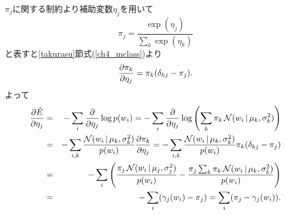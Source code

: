 $\pi_j$に関する制約より補助変数$\eta_j$を用いて
$$
\pi_j=\frac{\exp(\eta_j)}{\sum_k \exp(\eta_k)}
$$
と表すと\ref{takurasu}節式(\ref{ch4_mclass})より
$$
\diff{\eta_j}{\pi_k}=\pi_k(\delta_{kj}-\pi_j).
$$
よって
\begin{eqnarray*}
\diff{\eta_j}{\tilde{E}}
 &=& -\sum_i \dif{\eta_j} \log p(w_i)=-\sum_i\dif{\eta_j} \log \left(\sum_k \pi_k\, \calN(w_i\,|\,\mu_k,\sigma_k^2)\right)\\
 &=& -\sum_{i,k} \frac{\calN(w_i\,|\,\mu_k,\sigma_k^2)}{p(w_i)}\diff{\eta_j}{\pi_k}
  =  -\sum_{i,k} \frac{\calN(w_i\,|\,\mu_k,\sigma_k^2)}{p(w_i)}\pi_k(\delta_{kj}-\pi_j)\\
 &=& -\sum_i \left(\frac{\pi_j\, \calN(w_i\,|\,\mu_j,\sigma_j^2)}{p(w_i)}
     - \frac{\pi_j \sum_k \pi_k\, \calN(w_i\,|\,\mu_k,\sigma_k^2)}{p(w_i)}\right)\\
 &=& -\sum_i (\gamma_j(w_i) - \pi_j) = \sum_i (\pi_j - \gamma_j(w_i)).
\end{eqnarray*}
\vspace{0pt}


